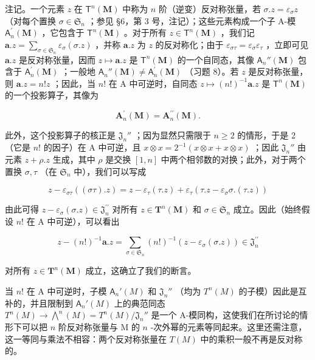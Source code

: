 注记。一个元素 \(z\) 在 \(\mathsf{T}^n (\mathbf{M})\) 中称为 \(n\) 阶（逆变）反对称张量，若 \(\sigma .z = \varepsilon_{\sigma}z\) （对每个置换 \(\sigma \in \mathfrak{S}_n\) ；参见 §6，第 3 号，注记）；这些元素构成一个子 A-模 \(\mathsf{A}_n^\prime (\mathbf{M})\) ，它包含于 \(\mathsf{T}^n (\mathbf{M})\) 。对于所有 \(z\in \mathsf{T}^n (\mathbf{M})\) ，我们记 \(\pmb {a}.z = \sum_{\sigma \in \mathfrak{S}_n}\varepsilon_\sigma (\sigma .z)\) ，并称 \(\pmb {a}.z\) 为 \(z\) 的反对称化；由于 \(\varepsilon_{\sigma \tau} = \varepsilon_{\sigma}\varepsilon_{\tau}\) ，立即可见 \(\pmb {a}.z\) 是反对称张量，因而 \(z\mapsto \pmb {a}.z\) 是 \(\mathsf{T}^n (\mathbf{M})\) 的一个自同态，其像 \(\mathsf{A}_n''(\mathbf{M})\) 包含于 \(\mathsf{A}_n^\prime (\mathbf{M})\) ；一般地 \(\mathsf{A}_n''(\mathbf{M})\neq \mathsf{A}_n^\prime (\mathbf{M})\) （习题 8）。若 \(z\) 是反对称张量，则 \(\pmb {a}.z = n!z\) ；因此，当 \(n!\) 在 A 中可逆时，自同态 \(z\mapsto (n!)^{-1}\pmb {a}.z\) 是 \(\mathsf{T}^n (\mathbf{M})\) 的一个投影算子，其像为

\[
\mathbf {A} _ {n} ^ {\prime} (\mathbf {M}) = \mathbf {A} _ {n} ^ {\prime \prime} (\mathbf {M}).
\]

此外，这个投影算子的核正是 \(\mathfrak{J}_n''\) ；因为显然只需限于 \(n \geqslant 2\) 的情形，于是 2（它是 \(n!\) 的因子）在 A 中可逆，且 \(x \otimes x = 2^{-1}(x \otimes x + x \otimes x)\) ；因此 \(\mathfrak{J}_n''\) 由元素 \(z + \rho . z\) 生成，其中 \(\rho\) 是交换 \([1, n]\) 中两个相邻数的对换；此外，对于两个置换 \(\sigma, \tau\) （在 \(\mathfrak{S}_n\) 中），我们可以写成

\[
z - \varepsilon_ {\sigma \tau} ((\sigma \tau). z) = z - \varepsilon_ {\tau} (\tau . z) + \varepsilon_ {\tau} (\tau . z - \varepsilon_ {\sigma} \sigma . (\tau . z))
\]

由此可得 \(z - \varepsilon_{\sigma}(\sigma . z) \in \mathfrak{J}_{n}^{\prime \prime}\) 对所有 \(z \in \mathbf{T}^{n}(\mathbf{M})\) 和 \(\sigma \in \mathfrak{S}_{n}\) 成立。因此（始终假设 \(n!\) 在 A 中可逆），可以看出

\[
z - (n!) ^ {- 1} \boldsymbol {a}. z = \sum_ {\sigma \in \mathfrak {S} _ {n}} (n!) ^ {- 1} (z - \varepsilon_ {\sigma} (\sigma . z)) \in \mathfrak {J} _ {n} ^ {\prime \prime}
\]

对所有 \(z \in \mathbf{T}^n(\mathbf{M})\) 成立，这确立了我们的断言。

当 \(n!\) 在 A 中可逆时，子模 \(\mathsf{A}_n'(M)\) 和 \(\mathfrak{J}_n''\) （均为 \(T^n(M)\) 的子模）因此是互补的，并且限制到 \(\mathsf{A}_n'(M)\) 上的典范同态 \(T^n(M) \to \bigwedge^n(M) = T^n(M)/\mathfrak{J}_n''\) 是一个 A-模同构，这使我们在所讨论的情形下可以把 \(n\) 阶反对称张量与 M 的 \(n\) -次外幂的元素等同起来。这里还需注意，这一等同与乘法不相容：两个反对称张量在 \(T(M)\) 中的乘积一般不再是反对称的。

